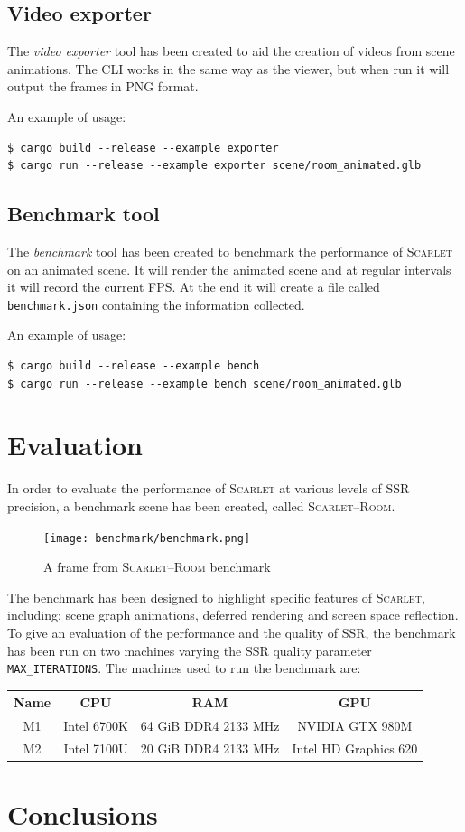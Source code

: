 \documentclass[11pt,a4paper]{report}
\begin{document}
\section{Video exporter}
The \textit{video exporter} tool has been created to aid the creation of videos from scene animations. The CLI works in the same way as the viewer, but when run it will output the frames in PNG format.

An example of usage:
\begin{verbatim}
$ cargo build --release --example exporter
$ cargo run --release --example exporter scene/room_animated.glb
\end{verbatim}

\section{Benchmark tool}
The \textit{benchmark} tool has been created to benchmark the performance of \textsc{Scarlet} on an animated scene. It will render the animated scene and at regular intervals it will record the current FPS. At the end it will create a file called \texttt{benchmark.json} containing the information collected.

An example of usage:
\begin{verbatim}
$ cargo build --release --example bench
$ cargo run --release --example bench scene/room_animated.glb
\end{verbatim}

\chapter{Evaluation}
In order to evaluate the performance of \textsc{Scarlet} at various levels of SSR precision, a benchmark scene has been created, called \textsc{Scarlet--Room}.

\begin{figure}[htp]
	\centering
	\texttt{[image: benchmark/benchmark.png]}
	\caption{A frame from \textsc{Scarlet--Room} benchmark}
	\label{eval:example}
\end{figure}

The benchmark has been designed to highlight specific features of \textsc{Scarlet}, including: scene graph animations, deferred rendering and screen space reflection. To give an evaluation of the performance and the quality of SSR, the benchmark has been run on two machines varying the SSR quality parameter \texttt{MAX\_ITERATIONS}. The machines used to run the benchmark are:

\begin{center}
	\begin{tabular}{ | c | c | c | c | } \hline
		Name & CPU & RAM & GPU \\ \hline
		M1 & Intel 6700K & 64 GiB DDR4 2133 MHz & NVIDIA GTX 980M \\
		M2 & Intel 7100U & 20 GiB DDR4 2133 MHz & Intel HD Graphics 620 \\
		\hline \end{tabular}
\end{center}

\chapter{Conclusions}
\end{document}
